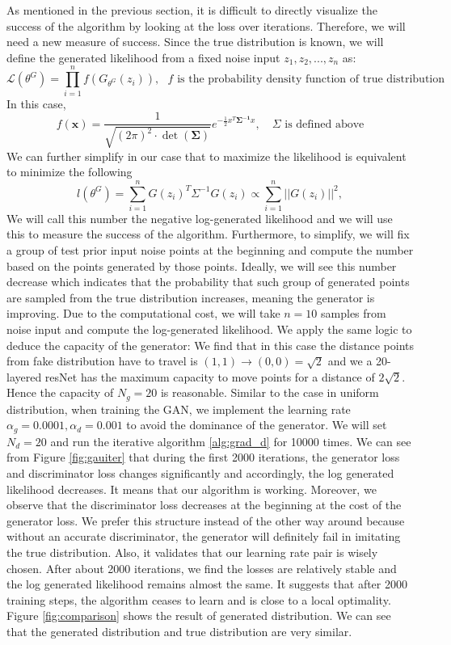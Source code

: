 As mentioned in the previous section, it is difficult to directly visualize the success of the algorithm by looking at the loss over iterations. Therefore, we will need a new measure of success. Since the true distribution is known, we will define the generated likelihood from a fixed noise input $z_1 , z_2 , ... , z_n$ as:
$$ \mathcal{L}(\theta^G) = \prod_{i = 1}^{n} f\left (G_{\theta^G}(z_i)\right), \text{   $f$ is the probability density function of true distribution}$$
In this case, 
$$ f (\boldsymbol{x}) =\frac{1}{\sqrt{(2 \pi)^{2} \cdot \det (\boldsymbol{\Sigma})}} e^{-\frac{1}{2}x^{T} 
\boldsymbol{\Sigma^{-1}} x},  \quad \Sigma \text{ is defined above}$$
We can further simplify in our case that to maximize the likelihood is equivalent to minimize the following $$l(\theta^G) = \sum_{i = 1}^{n} G(z_i)^T \Sigma^{-1} G(z_i) \propto \sum_{i = 1}^{n} ||G(z_i)||^2 ,$$
We will call this number the negative log-generated likelihood and we will use this to measure the success of the algorithm. Furthermore, to simplify, we will fix a group of test prior input noise points at the beginning and compute the number based on the points generated by those points. Ideally, we will see this number decrease which indicates that the probability that such group of generated points are sampled from the true distribution increases, meaning the generator is improving. Due to the computational cost, we will take $n= 10$ samples from noise input and compute the log-generated likelihood.
We apply the same logic to deduce the capacity of the generator: We find that in this case the distance points from fake distribution have to travel is $(1,1) \rightarrow (0,0) = \sqrt{2}$ and we a 20-layered resNet has the maximum capacity to move points for a distance of $2\sqrt{2}$. Hence the capacity of $N_g = 20$ is reasonable. Similar to the case in uniform distribution, when training the GAN, we implement the learning rate $\alpha_g = 0.0001, \alpha_d = 0.001$ to avoid the dominance of the generator. We will set $N_d = 20$ and run the iterative algorithm \ref{alg:grad_d} for 10000 times.
We can see from Figure \ref{fig:gauiter} that during the first 2000 iterations, the generator loss and discriminator loss changes significantly and accordingly, the log generated likelihood decreases. It means that our algorithm is working. Moreover, we observe that the discriminator loss decreases at the beginning at the cost of the generator loss. We prefer this structure instead of the other way around because without an accurate discriminator, the generator will definitely fail in imitating the true distribution. Also, it validates that our learning rate pair is wisely chosen. After about 2000 iterations, we find the losses are relatively stable and the log generated likelihood remains almost the same. It suggests that after 2000 training steps, the algorithm ceases to learn and is close to a local optimality. Figure \ref{fig:comparison} shows the result of generated distribution. We can see that the generated distribution and true distribution are very similar.
